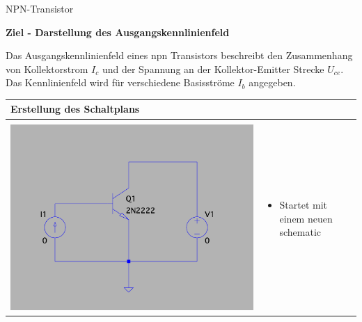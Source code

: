 \begin{frame}[t]{NPN-Transistor}

  \textbf{Ziel - Darstellung des Ausgangskennlinienfeld}

  \begin{spacing}{0.6} \begin{tiny}

      Das Ausgangskennlinienfeld eines npn Transistors beschreibt den Zusammenhang von Kollektorstrom $I_c$ und der Spannung
      an der Kollektor-Emitter Strecke $U_{ce}$. Das Kennlinienfeld wird für verschiedene Basisströme $I_b$ angegeben.
    \end{tiny} \end{spacing}
  \begin{spacing}{0.9} \begin{tiny}
      \begin{table}[h!]
        \begin{tabular}{p{3cm} p{7cm}}
          \hline
          \textbf{Erstellung des Schaltplans}   & \\
          \hline                                  \\
          \begin{minipage}{.3\textwidth}
            \includegraphics[width=\linewidth]{pictures/tran.png}
          \end{minipage}
                                                &
          \begin{minipage}{.7\textwidth}
            \begin{itemize}
              \item Startet mit einem neuen schematic

\end{itemize}
\end{minipage}
\end{tabular}
\end{table}
\end{tiny}
\end{spacing}
\end{frame}
